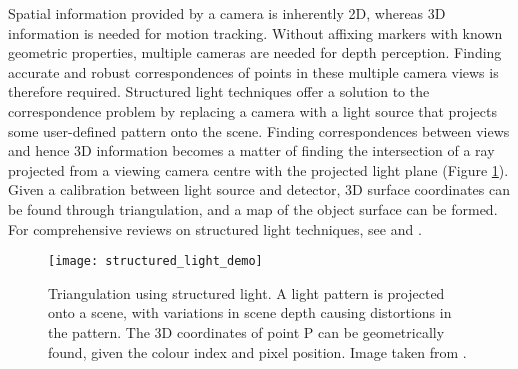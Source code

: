 \documentclass[class=article, crop=false]{standalone}
\begin{document}
Spatial information provided by a camera is inherently 2D, whereas 3D information is needed for motion tracking. Without affixing markers with known geometric properties, multiple cameras are needed for depth perception. Finding accurate and robust correspondences of points in these multiple camera views is therefore required. Structured light techniques offer a solution to the correspondence problem by replacing a camera with a light source that projects some user-defined pattern onto the scene. Finding correspondences between views and hence 3D information becomes a matter of finding the intersection of a ray projected from a viewing camera centre with the projected light plane (Figure \ref{struct_light}). Given a calibration between light source and detector, 3D surface coordinates can be found through triangulation, and a map of the object surface can be formed. For comprehensive reviews on structured light techniques, see \cite{Geng2011} and \cite{Salvi2010}.

\begin{figure}[!ht]
	\centering
	\texttt{[image: structured\_light\_demo]}
	\caption{Triangulation using structured light. A light pattern is projected onto a scene, with variations in scene depth causing distortions in the pattern. The 3D coordinates of point P can be geometrically found, given the colour index and pixel position. Image taken from \parencite{Geng2011}.}
	\label{struct_light}
\end{figure}
\end{document}
